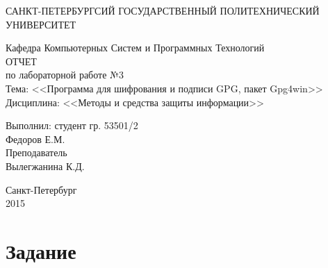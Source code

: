\documentclass[utf8x, 12pt]{G7-32}
\begin{document}
\frontmatter 


\begin{center} 

\large САНКТ-ПЕТЕРБУРГСИЙ ГОСУДАРСТВЕННЫЙ ПОЛИТЕХНИЧЕСКИЙ УНИВЕРСИТЕТ

\large Кафедра Компьютерных Систем и Программных Технологий \\[5.5cm] 

\huge ОТЧЕТ \\[0.6cm] %
\large по лабораторной работе №3\\
\large Тема: <<Программа для шифрования и подписи GPG, пакет Gpg4win>>\\
\large Дисциплина: <<Методы и средства защиты информации>>\\[3.7cm]

\end{center} 

\begin{flushright}
Выполнил: студент гр. 53501/2 \\
Федоров Е.М. \\[1.2cm]


Преподаватель \\
Вылегжанина К.Д.
\end{flushright}


\vfill 

\begin{center} 
\large Санкт-Петербург \\
2015
\end{center} 

\thispagestyle{empty}



\thispagestyle{empty}
\setcounter{page}{0}
\tableofcontents
\clearpage
\mainmatter


\chapter{Задание}
\end{document}
